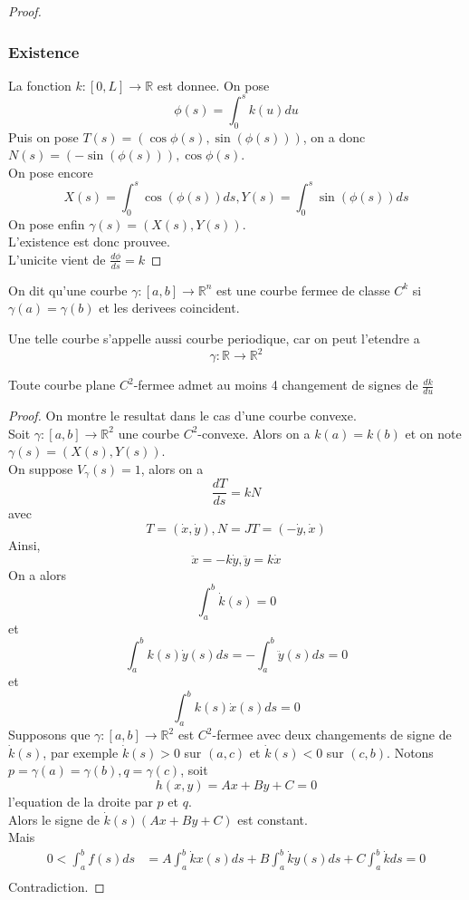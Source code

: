 \documentclass[../main.tex]{subfiles}
\begin{document}
\begin{proof}
\subsubsection*{Existence}
La fonction $k: [ 0,L] \to \mathbb{R}$ est donnee. On pose 
\[ 
	\phi( s) = \int_{ 0 }^{ s } k( u) du
\]
Puis on pose $T( s) = ( \cos\phi( s) ,\sin( \phi( s) ) ) $, on a donc $N( s) = ( -\sin( \phi( s) ) ) , \cos\phi( s) $.\\
On pose encore
\[ 
	X( s) = \int_{ 0 }^{ s }\cos( \phi( s) ) ds, Y( s) = \int_{ 0 }^{ s }\sin( \phi( s) ) ds
\]
On pose enfin $\gamma( s) = ( X( s) , Y( s) ) $.\\
L'existence est donc prouvee.\\
L'unicite vient de $ \frac{d\phi}{ds}=k$ 
\end{proof}
\begin{defn}
	On dit qu'une courbe $\gamma: [ a,b] \to \mathbb{R}^n$ est une courbe fermee de classe $C^{k}$ si $\gamma( a) =\gamma( b)$ et les derivees coincident.
\end{defn}	
Une telle courbe s'appelle aussi courbe periodique, car on peut l'etendre a 
\[ 
\gamma: \mathbb{R}\to \mathbb{R}^{2}
\]
\begin{thm}
	Toute courbe plane $C^{2}$-fermee admet au moins 4 changement de signes  de $ \frac{dk}{du}$ 	
\end{thm}
\begin{proof}
On montre le resultat dans le cas d'une courbe convexe.\\
Soit $\gamma: [ a,b] \to \mathbb{R}^{2}$ une courbe $C^{2}$-convexe. Alors on a $k( a) =k( b) $ et on note $\gamma( s) = ( X( s) ,Y( s) ) $.\\
On suppose $V_\gamma( s) =1$, alors on a
\[ 
\frac{dT}{ds}= kN
\]
avec 
\[ 
	T= ( \dot x,\dot y) , N = JT= ( -\dot y, \dot x) 
\]
Ainsi,
\[ 
\ddot x= - k \dot y, \ddot y = k \dot x
\]
On a alors
\[ 
	\int_{ a }^{ b }  \dot k ( s) = 0
\]
et
\[ 
	\int_{ a }^{ b } k( s) \dot y ( s) ds = - \int_{ a }^{ b }\ddot  y ( s) ds =0
\]
et
\[ 
	\int_{ a }^{ b }k( s) \dot x ( s) ds =0
\]
Supposons que $\gamma: [ a,b] \to \mathbb{R}^{2}$ est $C^{2}$-fermee avec deux changements de signe de $\dot k ( s) $, par exemple $\dot k ( s) >0$ sur $ ( a,c) $ et $\dot k ( s) <0$ sur $ ( c,b) $. Notons $p= \gamma( a) = \gamma( b) , q = \gamma( c) $, soit
\[ 
	h( x,y) = Ax + By+C=0
\]
l'equation de la droite par $p$ et $q$.\\
Alors le signe de $\dot k ( s)( Ax+By +C)  $ est constant.\\
Mais 
\begin{align*}
0<	\int_{ a }^{ b } f( s) ds &= A \int_{ a }^{ b }\dot k x( s) ds + B \int_{ a }^{ b }\dot k y( s) ds + C \int_{ a }^{ b }\dot k ds=0\\
\end{align*}
Contradiction.			
		
\end{proof}
\end{document}
